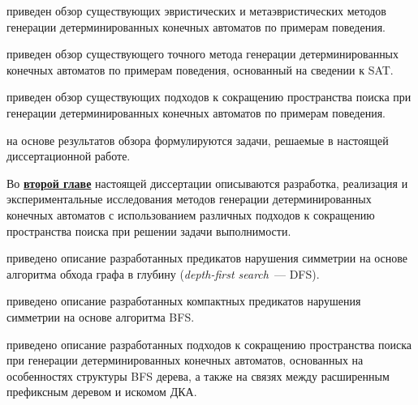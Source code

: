 \insection{\ref{sec:review:heuristic-dfa-inf}} приведен обзор существующих эвристических и метаэвристических методов генерации детерминированных конечных автоматов по примерам поведения. 

\insection{\ref{sec:review:sat-dfa-inf}} приведен обзор существующего точного метода генерации детерминированных конечных автоматов по примерам поведения, основанный на сведении к SAT.

\insection{\ref{sec:review:sym-breaking}} приведен обзор существующих подходов к сокращению пространства поиска при генерации детерминированных конечных автоматов по примерам поведения.

\insection{\ref{sec:review:tasks}} на основе результатов обзора формулируются задачи, решаемые в настоящей диссертационной работе.


Во \textbf{\underline{второй главе}} настоящей диссертации описываются разработка, реализация и экспериментальные исследования методов генерации детерминированных конечных автоматов с использованием различных подходов к сокращению пространства поиска при решении задачи выполнимости.

\insection{\ref{sec:space:dfs}} приведено описание разработанных предикатов нарушения симметрии на основе алгоритма обхода графа в глубину (\emph{depth-first search}~--- DFS).  

\insection{\ref{sec:space:tight}} приведено описание разработанных компактных предикатов нарушения симметрии на основе алгоритма BFS.  

\insection{\ref{sec:space:pruning}} приведено описание разработанных подходов к сокращению пространства поиска при генерации детерминированных конечных автоматов, основанных на особенностях структуры BFS дерева, а также на связях между расширенным префиксным деревом и искомом ДКА. 

